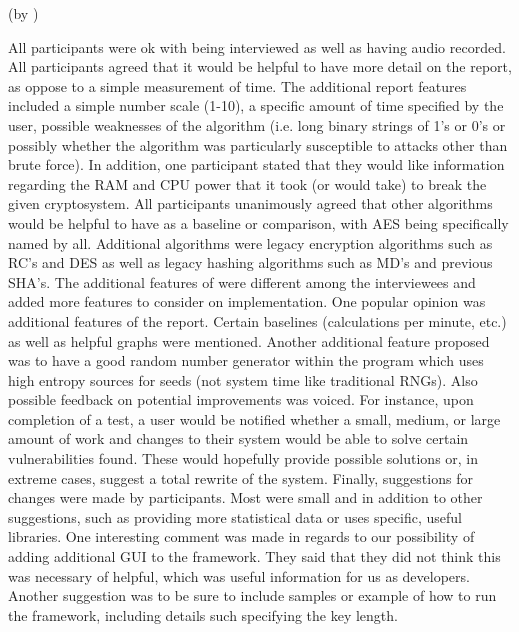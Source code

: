 (by \dd) \bigskip

All participants were ok with being interviewed as well as
having audio recorded. All participants
agreed that it would be helpful to have more detail on the
report, as oppose to a simple measurement of time. The
additional report features included a simple number scale
(1-10), a specific amount of time specified by the user,
possible weaknesses of the algorithm (i.e. long binary
strings of 1's or 0's or possibly whether the algorithm was
particularly susceptible to attacks other than brute force).
In addition, one participant stated that they would like
information regarding the RAM and CPU power that it took (or
would take) to break the given cryptosystem. All
participants unanimously agreed that other algorithms would
be helpful to have as a baseline or comparison, with AES
being specifically named by all. Additional algorithms were
legacy encryption algorithms such as RC's and DES as well as
legacy hashing algorithms such as MD's and previous SHA's.
The additional features of \cry{} were different among the
interviewees and added more features to consider on
implementation. One popular opinion was additional features
of the report. Certain baselines (calculations per minute,
etc.) as well as helpful graphs were mentioned. Another
additional feature proposed was to have a good random number
generator within the program which uses high entropy sources
for seeds (not system time like traditional RNGs). Also
possible feedback on potential improvements was voiced. For
instance, upon completion of a test, a user would be
notified whether a small, medium, or large amount of work
and changes to their system would be able to solve certain
vulnerabilities found. These would hopefully provide possible
solutions or, in extreme cases, suggest a total rewrite of
the system. Finally, suggestions for changes were made by
participants. Most were small and in addition to other
suggestions, such as providing more statistical data or uses
specific, useful libraries. One interesting comment was made
in regards to our possibility of adding additional GUI to the
framework. They said that they did not think this was
necessary of helpful, which was useful information for us as
developers. Another suggestion was to be sure to include
samples or example of how to run the framework, including
details such specifying the key length.

